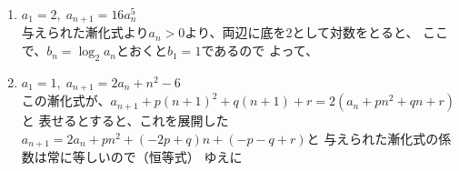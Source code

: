 \documentclass[a4paper]{ltjsarticle}
\begin{document}
\begin{question*}
\begin{ans*}
\begin{enumerate}[label=\arabic*.]
  \item  $a_1 = 2,\; a_{n+1} = 16a_n^5$ \jisuusoui \\
  与えられた漸化式より$a_n> 0$より、両辺に底を2として対数をとると、
  ここで、$b_n = \log_2 a_n$とおくと$b_1 = 1$であるので
  よって、
  \item $a_1 = 1,\; a_{n+1} = 2a_n + n^2 -6$ \\
  この漸化式が、$a_{n+1} + p(n+1)^2 + q(n+1) + r = 2(a_n + pn^2 + qn + r)$と
  表せるとすると、これを展開した$a_{n+1} = 2a_n + pn^2 + (-2p + q)n + (-p-q+r)$と
  与えられた漸化式の係数は常に等しいので（恒等式）
  ゆえに


\end{enumerate}
\end{ans*}
\end{question*}
\end{document}
